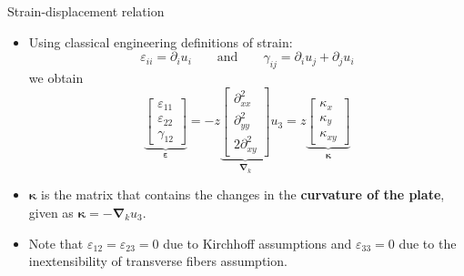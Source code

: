 \documentclass[aspectratio=169]{beamer}
\begin{document}
\begin{frame}{Strain-displacement relation}
  \begin{itemize}
    \item Using classical engineering definitions of strain: $$\varepsilon_{ii}=\partial_i u_i\qquad\text{and}\qquad\gamma_{ij}=\partial_i u_j+\partial_j u_i$$ we obtain
          $$\underbrace{\begin{bmatrix}
                \varepsilon_{11} \\ \varepsilon_{22} \\ \gamma_{12}
              \end{bmatrix}}_\text{$\boldsymbol{\varepsilon}$} = -z \underbrace{\begin{bmatrix}
                \partial^2_{xx} \\[7pt]
                \partial^2_{yy} \\[7pt]
                2\partial^2_{xy}
              \end{bmatrix}}_\text{$\boldsymbol{\nabla}_{k}$}u_3= z  \underbrace{\begin{bmatrix}
                \kappa_x \\ \kappa_y \\ \kappa_{xy}
              \end{bmatrix}}_\text{$\boldsymbol{\kappa}$}$$
    \item $\boldsymbol{\kappa}$ is the matrix that contains the changes in the \textbf{curvature of the plate}, given as $\boldsymbol{\kappa}=-\boldsymbol{\nabla}_{k}u_3$.
    \item Note that $\varepsilon_{12}=\varepsilon_{23}=0$ due to Kirchhoff assumptions and $\varepsilon_{33}=0$ due to the inextensibility of transverse fibers assumption.
  \end{itemize}
\end{frame}
\end{document}
